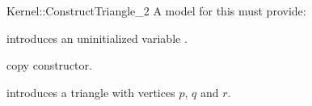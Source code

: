 \begin{ccRefFunctionObjectConcept}{Kernel::ConstructTriangle_2}
A model for this must provide:


\ccHidden {}
             {introduces an uninitialized variable .}

\ccHidden {}
            {copy constructor.}


            {introduces a triangle  with vertices $p$,  $q$ and $r$.}

\ccSeeAlso
{}\\

\end{ccRefFunctionObjectConcept}
